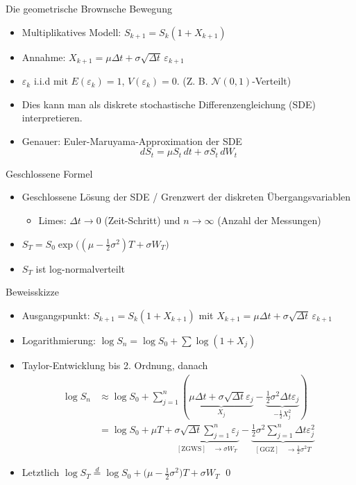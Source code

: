 \documentclass{beamer}
\begin{document}
\begin{frame}{Die geometrische Brownsche Bewegung}
  \begin{itemize}
      \item Multiplikatives Modell: $S_{k+1}=S_k(1+X_{k+1})$
      \item Annahme: $X_{k+1}=\mu\Delta t+\sigma\sqrt{\Delta t}\,\varepsilon_{k+1}$
      \item $\varepsilon_k$ i.i.d mit $E(\varepsilon_k)=1$, $V(\varepsilon_k)=0$. (Z. B. $\mathcal N(0,1)$-Verteilt)
      \item Dies kann man als diskrete stochastische Differenzengleichung (SDE) interpretieren.
      \item Genauer: Euler-Maruyama-Approximation der SDE $$dS_t = \mu S_t\,dt + \sigma S_t\,dW_t$$
  \end{itemize}
\end{frame}

\begin{frame}{Geschlossene Formel}
  \begin{itemize}
      \item Geschlossene Lösung der SDE / Grenzwert der diskreten Übergangsvariablen
      \begin{itemize}
        \item Limes: $\Delta t \to 0$ (Zeit-Schritt) und $n \to \infty$ (Anzahl der Messungen)
      \end{itemize}
      \item $S_T = S_0 \exp\big((\mu-\tfrac12\sigma^2)T + \sigma W_T\big)$
      \item $S_T$ ist log-normalverteilt
  \end{itemize}
\end{frame}

\begin{frame}{Beweisskizze}
  \begin{itemize}
      \item Ausgangspunkt: $S_{k+1}=S_k(1+X_{k+1})$ mit $X_{k+1}=\mu\Delta t+\sigma\sqrt{\Delta t}\,\varepsilon_{k+1}$
      \item Logarithmierung: $\log S_n = \log S_0 + \sum \log(1+X_j)$
      \item Taylor-Entwicklung bis 2. Ordnung, danach $$
\begin{aligned}
\log S_n &\approx \log S_0 + \sum_{j=1}^n\left( \underbrace{\mu \Delta t + \sigma\sqrt{\Delta t} \varepsilon_j}_{X_j} - \underbrace{\frac{1}{2} \sigma^2 \Delta t \varepsilon_j}_{-\frac{1}{2} X_j^2} \right)
\\ &= \log S_0 + \mu T +  \underbrace{\sigma\sqrt{\Delta t} \sum_{j=1}^{n} \varepsilon_j}_{\mathrm{[ZGWS]} \quad \to \sigma W_T} - \underbrace{\frac{1}{2} \sigma^2 \sum_{j=1}^{n} \Delta t \varepsilon_j^2}_{\mathrm{[GGZ]} \quad \to \frac12 \sigma^2 T}
\end{aligned}
$$
      \item Letztlich $\log S_T \overset{d} = \log S_0 + \big(\mu - \tfrac12 \sigma^2\big)T + \sigma W_T$ \qed
  \end{itemize}
\end{frame}
\end{document}

